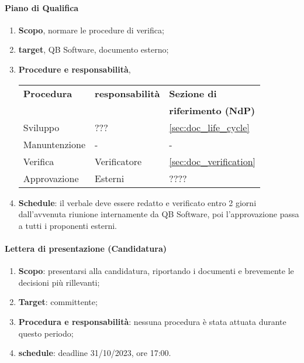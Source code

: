         \paragraph{Piano di Qualifica}
        \begin{enumerate}
            \item \textbf{Scopo}, normare le procedure di verifica;
            \item \textbf{target}, QB Software, documento esterno;
            \item \textbf{Procedure e responsabilità},
                \newline
                \begin{tabularx}{0.93\textwidth}{|X|X|X|}
                    \hline
                    \textbf{Procedura} & \textbf{responsabilità} & \textbf{Sezione di} \\
                    & & \textbf{riferimento (NdP)} \\
                    \hline
                    Sviluppo & ??? &  \ref{sec:doc_life_cycle}
                    \\\hline
                    Manuntenzione & - & -
                    \\\hline
                    Verifica & Verificatore & \ref{sec:doc_verification}
                    \\\hline
                    Approvazione & Esterni & ????
                    \\\hline
                \end{tabularx}
            \item \textbf{Schedule}: il verbale deve essere redatto e verificato entro 2 giorni dall'avvenuta riunione internamente da QB Software, poi l'approvazione passa a tutti i proponenti esterni.
        \end{enumerate} 

        \paragraph{Lettera di presentazione (Candidatura)}
            \begin{enumerate}
                \item \textbf{Scopo}: presentarsi alla candidatura, riportando i documenti e brevemente le decisioni più rillevanti;
                \item \textbf{Target}: committente;
                \item \textbf{Procedura e responsabilità}: nessuna procedura è stata attuata durante questo periodo;
                \item \textbf{schedule}: deadline 31/10/2023, ore 17:00.
            \end{enumerate} 

